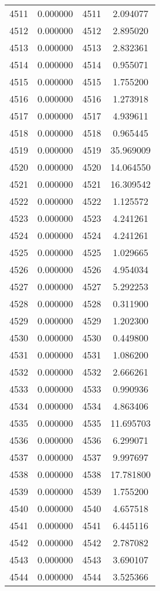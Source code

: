 \documentclass[12pt]{article}
\begin{document}
\begin{longtable}{@{}cccc@{}}
4511 & 0.000000 & 4511 & 2.094077 \\
4512 & 0.000000 & 4512 & 2.895020 \\
4513 & 0.000000 & 4513 & 2.832361 \\
4514 & 0.000000 & 4514 & 0.955071 \\
4515 & 0.000000 & 4515 & 1.755200 \\
4516 & 0.000000 & 4516 & 1.273918 \\
4517 & 0.000000 & 4517 & 4.939611 \\
4518 & 0.000000 & 4518 & 0.965445 \\
4519 & 0.000000 & 4519 & 35.969009 \\
4520 & 0.000000 & 4520 & 14.064550 \\
4521 & 0.000000 & 4521 & 16.309542 \\
4522 & 0.000000 & 4522 & 1.125572 \\
4523 & 0.000000 & 4523 & 4.241261 \\
4524 & 0.000000 & 4524 & 4.241261 \\
4525 & 0.000000 & 4525 & 1.029665 \\
4526 & 0.000000 & 4526 & 4.954034 \\
4527 & 0.000000 & 4527 & 5.292253 \\
4528 & 0.000000 & 4528 & 0.311900 \\
4529 & 0.000000 & 4529 & 1.202300 \\
4530 & 0.000000 & 4530 & 0.449800 \\
4531 & 0.000000 & 4531 & 1.086200 \\
4532 & 0.000000 & 4532 & 2.666261 \\
4533 & 0.000000 & 4533 & 0.990936 \\
4534 & 0.000000 & 4534 & 4.863406 \\
4535 & 0.000000 & 4535 & 11.695703 \\
4536 & 0.000000 & 4536 & 6.299071 \\
4537 & 0.000000 & 4537 & 9.997697 \\
4538 & 0.000000 & 4538 & 17.781800 \\
4539 & 0.000000 & 4539 & 1.755200 \\
4540 & 0.000000 & 4540 & 4.657518 \\
4541 & 0.000000 & 4541 & 6.445116 \\
4542 & 0.000000 & 4542 & 2.787082 \\
4543 & 0.000000 & 4543 & 3.690107 \\
4544 & 0.000000 & 4544 & 3.525366 \\

\end{longtable}
\end{document}

